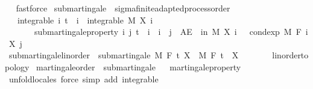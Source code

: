 \begin{isabellebody}
\isadelimproof
\ %
\endisadelimproof
%
\isatagproof
{}\isamarkupfalse%
\ fastforce%
\endisatagproof
{\isafoldproof}%
%
\isadelimproof
%
\endisadelimproof
%
\isadelimdocument
%
\endisadelimdocument
%
\isatagdocument
%
\isamarkuptrue%
%
\endisatagdocument
{\isafolddocument}%
%
\isadelimdocument
%
\endisadelimdocument
{}\isamarkupfalse%
\ submartingale\ {\isacharequal}{\kern0pt}\ sigma{\isacharunderscore}{\kern0pt}finite{\isacharunderscore}{\kern0pt}adapted{\isacharunderscore}{\kern0pt}process{\isacharunderscore}{\kern0pt}order\ {\isacharplus}{\kern0pt}\isanewline
\ \ \ integrable{\isacharcolon}{\kern0pt}\ {\isachardoublequoteopen}{\isasymAnd}i{\isachardot}{\kern0pt}\ t\ {\isasymle}\ i\ {\isasymLongrightarrow}\ integrable\ M\ {\isacharparenleft}{\kern0pt}X\ i{\isacharparenright}{\kern0pt}{\isachardoublequoteclose}\isanewline
\ \ \ \ \ \ \ submartingale{\isacharunderscore}{\kern0pt}property{\isacharcolon}{\kern0pt}\ {\isachardoublequoteopen}{\isasymAnd}i\ j{\isachardot}{\kern0pt}\ t\ {\isasymle}\ i\ {\isasymLongrightarrow}\ i\ {\isasymle}\ j\ {\isasymLongrightarrow}\ AE\ {\isasymxi}\ in\ M{\isachardot}{\kern0pt}\ X\ i\ {\isasymxi}\ {\isasymle}\ cond{\isacharunderscore}{\kern0pt}exp\ M\ {\isacharparenleft}{\kern0pt}F\ i{\isacharparenright}{\kern0pt}\ {\isacharparenleft}{\kern0pt}X\ j{\isacharparenright}{\kern0pt}\ {\isasymxi}{\isachardoublequoteclose}\isanewline
\isanewline
{}\isamarkupfalse%
\ submartingale{\isacharunderscore}{\kern0pt}linorder\ {\isacharequal}{\kern0pt}\ submartingale\ M\ F\ t\ X\ \ M\ F\ t\ \ X\ {\isacharcolon}{\kern0pt}{\isacharcolon}{\kern0pt}\ {\isachardoublequoteopen}{\isacharunderscore}{\kern0pt}\ {\isasymRightarrow}\ {\isacharunderscore}{\kern0pt}\ {\isasymRightarrow}\ {\isacharunderscore}{\kern0pt}\ {\isacharcolon}{\kern0pt}{\isacharcolon}{\kern0pt}\ {\isacharbraceleft}{\kern0pt}linorder{\isacharunderscore}{\kern0pt}topology{\isacharbraceright}{\kern0pt}{\isachardoublequoteclose}\isanewline
\isanewline
{}\isamarkupfalse%
\ martingale{\isacharunderscore}{\kern0pt}order\ {\isasymsubseteq}\ submartingale%
\isadelimproof
\ %
\endisadelimproof
%
\isatagproof
{}\isamarkupfalse%
\ martingale{\isacharunderscore}{\kern0pt}property\ \isamarkupfalse%
\ {\isacharparenleft}{\kern0pt}unfold{\isacharunderscore}{\kern0pt}locales{\isacharparenright}{\kern0pt}\ {\isacharparenleft}{\kern0pt}force\ simp\ add{\isacharcolon}{\kern0pt}\ integrable{\isacharparenright}{\kern0pt}{\isacharplus}{\kern0pt}%

\end{isabellebody}
